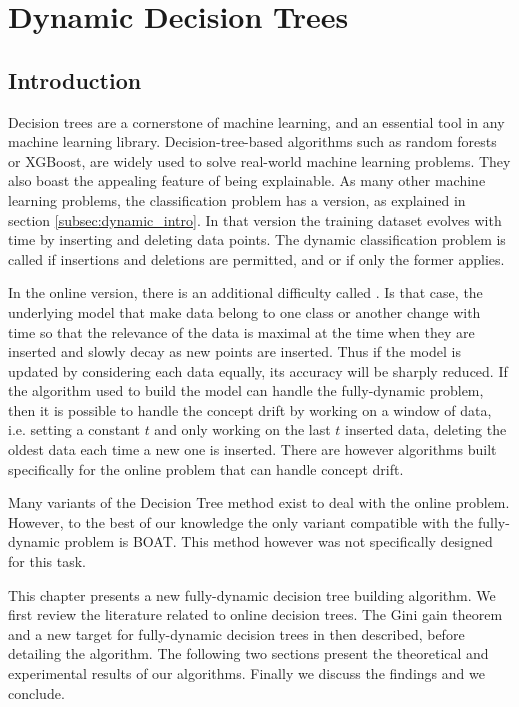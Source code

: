 \chapter{Dynamic Decision Trees}
\section{Introduction}
Decision trees are a cornerstone of machine learning, and an essential tool in any machine learning library. Decision-tree-based algorithms such as random forests or XGBoost, are widely used to solve real-world machine learning problems. They also boast the appealing feature of being explainable.
As many other machine learning problems, the classification problem has a  version, as explained in section \ref{subsec:dynamic_intro}. In that version the training dataset evolves with time by inserting and deleting data points. The dynamic classification problem is called  if insertions and deletions are permitted, and  or  if only the former applies.

In the online version, there is an additional difficulty called . Is that case, the underlying model that make data belong to one class or another change with time so that the relevance of the data is maximal at the time when they are inserted and slowly decay as new points are inserted. Thus if the model is updated by considering each data equally, its accuracy will be sharply reduced. If the algorithm used to build the model can handle the fully-dynamic problem, then it is possible to handle the concept drift by working on a window of data, i.e. setting a constant $t$ and only working on the last $t$ inserted data, deleting the oldest data each time a new one is inserted. There are however algorithms built specifically for the online problem that can handle concept drift.

Many variants of the Decision Tree method exist to deal with the online problem. However, to the best of our knowledge the only variant compatible with the fully-dynamic problem is BOAT. This method however was not specifically designed for this task.

This chapter presents a new fully-dynamic decision tree building algorithm. We first review the literature related to online decision trees. The Gini gain theorem and a new target for fully-dynamic decision trees in then described, before detailing the algorithm. The following two sections present the theoretical and experimental results of our algorithms. Finally we discuss the findings and we conclude.

